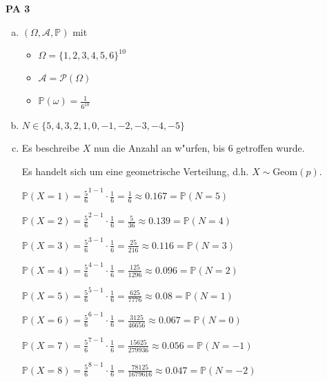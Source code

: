 \documentclass[a4paper,12pt]{article}
\newcommand{\PAufgabe}[1]{
        {
        \vspace*{0.5cm}
        \textbf{PA #1}
        \vspace*{0.2cm}
    }
}
\begin{document}
    \PAufgabe{3}
    \begin{enumerate}[(a)]
        \item 

        $ (\Omega, \mathcal{A}, \mathbb{P}) $ mit
        \begin{itemize}
            \item $ \Omega = \{1, 2, 3, 4, 5, 6\}^{10} $
            \item $ \mathcal{A} = \mathcal{P}(\Omega) $
            \item $ \mathbb{P}(\omega) = \frac{1}{6^{10}} $
        \end{itemize}

        \item

        $ N \in \{5, 4, 3, 2, 1, 0, -1, -2, -3, -4, -5\} $

        \item
        
        Es beschreibe $ X $ nun die Anzahl an w"urfen, bis 6 getroffen wurde.

        Es handelt sich um eine geometrische Verteilung, d.h. $ X \sim \text{Geom}(p) $.

        $ \displaystyle \mathbb{P}(X = 1) = \frac{5}{6}^{1 - 1} \cdot \frac{1}{6} = \frac{1}{6} \approx 0.167 = \mathbb{P}(N = 5) $

        $ \displaystyle \mathbb{P}(X = 2) = \frac{5}{6}^{2 - 1} \cdot \frac{1}{6} = \frac{5}{36} \approx 0.139 = \mathbb{P}(N = 4) $

        $ \displaystyle \mathbb{P}(X = 3) = \frac{5}{6}^{3 - 1} \cdot \frac{1}{6} = \frac{25}{216} \approx 0.116 = \mathbb{P}(N = 3) $

        $ \displaystyle \mathbb{P}(X = 4) = \frac{5}{6}^{4 - 1} \cdot \frac{1}{6} = \frac{125}{1296} \approx 0.096 = \mathbb{P}(N = 2) $

        $ \displaystyle \mathbb{P}(X = 5) = \frac{5}{6}^{5 - 1} \cdot \frac{1}{6} = \frac{625}{7776} \approx 0.08 = \mathbb{P}(N = 1) $

        $ \displaystyle \mathbb{P}(X = 6) = \frac{5}{6}^{6 - 1} \cdot \frac{1}{6} = \frac{3125}{46656} \approx 0.067 = \mathbb{P}(N = 0) $

        $ \displaystyle \mathbb{P}(X = 7) = \frac{5}{6}^{7- 1} \cdot \frac{1}{6} = \frac{15625}{279936} \approx 0.056 = \mathbb{P}(N = -1) $

        $ \displaystyle \mathbb{P}(X = 8) = \frac{5}{6}^{8 - 1} \cdot \frac{1}{6} = \frac{78125}{1679616} \approx 0.047 = \mathbb{P}(N = -2) $


\end{enumerate}
\end{document}
